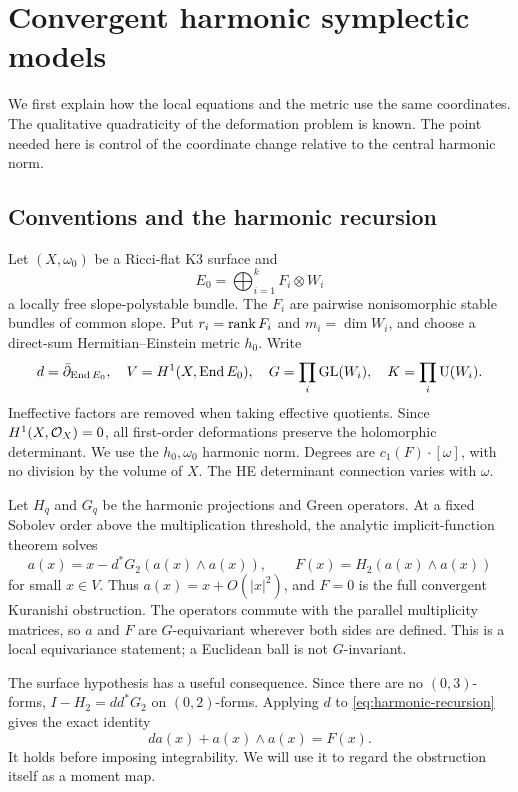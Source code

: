 \section{Convergent harmonic symplectic models}\label{sec:harmonic-models}

We first explain how the local equations and the metric use the same
coordinates. The qualitative quadraticity of the deformation problem
is known. The point needed here is control of the coordinate change
relative to the central harmonic norm.

\subsection{Conventions and the harmonic recursion}
Let $(X,\omega_0)$ be a Ricci-flat K3 surface and
\[
 E_0=\bigoplus_{i=1}^k F_i\otimes W_i
\]
a locally free slope-polystable bundle. The $F_i$ are pairwise
nonisomorphic stable bundles of common slope. Put $r_i=\operatorname{rank} F_i$
and $m_i=\dim W_i$, and choose a direct-sum Hermitian--Einstein
metric $h_0$. Write
\[
 d=\bar\partial_{\operatorname{End} E_0},\quad V=H^1(X,\operatorname{End} E_0),\quad
 G=\prod_i\mathrm{GL}(W_i),\quad K=\prod_i\mathrm U(W_i).
\]
Ineffective factors are removed when taking effective quotients.
Since $H^1(X,\mathcal O_X)=0$, all first-order deformations preserve the
holomorphic determinant. We use the $h_0,\omega_0$ harmonic norm.
Degrees are $c_1(F)\cdot[\omega]$, with no division by the volume
of $X$. The HE determinant connection varies with $\omega$.

Let $H_q$ and $G_q$ be the harmonic projections and Green operators.
At a fixed Sobolev order above the multiplication threshold, the
analytic implicit-function theorem solves
\begin{equation}\label{eq:harmonic-recursion}
 a(x)=x-d^*G_2(a(x)\wedge a(x)),\qquad
 F(x)=H_2(a(x)\wedge a(x))
\end{equation}
for small $x\in V$. Thus $a(x)=x+O(|x|^2)$, and $F=0$ is the
full convergent Kuranishi obstruction. The operators commute with
the parallel multiplicity matrices, so $a$ and $F$ are
$G$-equivariant wherever both sides are defined. This is a local
equivariance statement; a Euclidean ball is not $G$-invariant.

The surface hypothesis has a useful consequence. Since there are no
$(0,3)$-forms, $I-H_2=dd^*G_2$ on $(0,2)$-forms. Applying $d$ to
\eqref{eq:harmonic-recursion} gives the exact identity
\begin{equation}\label{eq:whole-curvature}
 da(x)+a(x)\wedge a(x)=F(x).
\end{equation}
It holds before imposing integrability. We will use it to regard the
obstruction itself as a moment map.

